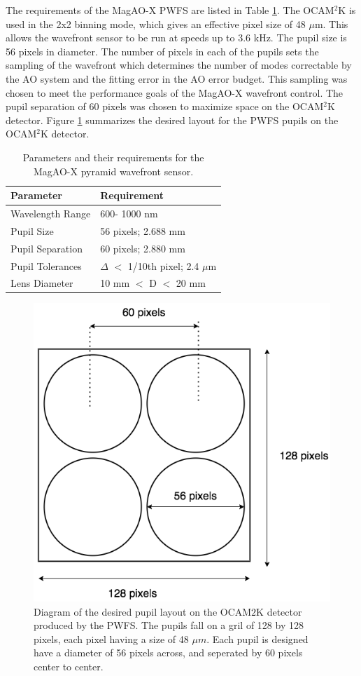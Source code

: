  The requirements of the MagAO-X PWFS are listed in Table \ref{tab:requirements}. The OCAM$^2$K is used in the 2x2 binning mode, which gives an effective pixel size of 48 $\mu$m. This allows the wavefront sensor to be run at speeds up to 3.6 kHz. The pupil size is 56 pixels in diameter. The number of pixels in each of the pupils sets the sampling of the wavefront which determines the number of modes correctable by the AO system and the fitting error in the AO error budget. This sampling was chosen to meet the performance goals of the MagAO-X wavefront control. The pupil separation of 60 pixels was chosen to maximize space on the OCAM$^2$K detector. Figure \ref{fig:PWFSpupils} summarizes the desired layout for the PWFS pupils on the OCAM$^2$K detector. 
	
\begin{table}
	\begin{center}
		\begin{tabular}{ | l| l | }
			\hline
			\textbf{Parameter}& \textbf{Requirement} \\ \hline
			Wavelength Range &600- 1000 nm \\ \hline
			Pupil Size & 56 pixels; 2.688 mm \\ \hline
			Pupil Separation & 60 pixels; 2.880 mm  \\ \hline
			Pupil Tolerances & $\Delta$ $<$ 1/10th pixel; 2.4 $\mu$m  \\ \hline
			Lens Diameter & 10 mm $<$ D  $<$ 20 mm \\ \hline
				
		\end{tabular}
	\end{center}
	\caption{Parameters and their requirements for the MagAO-X pyramid wavefront sensor.}
	\label{tab:requirements}
\end{table}

\begin{figure}
    \centering
    \includegraphics[width=.5\textwidth]{Chapter Materials/Chapter Three Materials/MagAOXpupils.png}
    \caption{Diagram of the desired pupil layout on the OCAM$2$K detector produced by the PWFS. The pupils fall on a gril of 128 by 128 pixels, each pixel having a size of 48 $\mu m$. Each pupil is designed have a diameter of 56 pixels across, and seperated by 60 pixels center to center.}
    \label{fig:PWFSpupils}
\end{figure}
    
